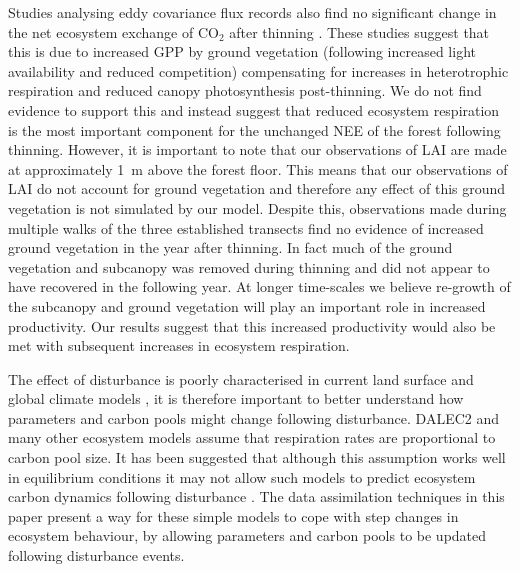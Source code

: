 \documentclass[draft,linenumbers]{agujournal}
\begin{document}
Studies analysing eddy covariance flux records also find no significant change in the net ecosystem exchange of CO\(_{2}\) after thinning \citep{vesala2005effect, wilkinson2015effects, moreaux2011paired, dore2012recovery}. These studies suggest that this is due to increased GPP by ground vegetation (following increased light availability and reduced competition) compensating for increases in heterotrophic respiration and reduced canopy photosynthesis post-thinning. We do not find evidence to support this and instead suggest that reduced ecosystem respiration is the most important component for the unchanged NEE of the forest following thinning. However, it is important to note that our observations of LAI are made at approximately 1~m above the forest floor. This means that our observations of LAI do not account for ground vegetation and therefore any effect of this ground vegetation is not simulated by our model. Despite this, observations made during multiple walks of the three established transects find no evidence of increased ground vegetation in the year after thinning. In fact much of the ground vegetation and subcanopy was removed during thinning and did not appear to have recovered in the following year. At longer time-scales we believe re-growth of the subcanopy and ground vegetation will play an important role in increased productivity. Our results suggest that this increased productivity would also be met with subsequent increases in ecosystem respiration.






The effect of disturbance is poorly characterised in current land surface and global climate models \citep{running2008ecosystem}, it is therefore important to better understand how parameters and carbon pools might change following disturbance. DALEC2 and many other ecosystem models assume that respiration rates are proportional to carbon pool size. It has been suggested that although this assumption works well in equilibrium conditions it may not allow such models to predict ecosystem carbon dynamics following disturbance \citep{schimel2003implications}. The data assimilation techniques in this paper present a way for these simple models to cope with step changes in ecosystem behaviour, by allowing parameters and carbon pools to be updated following disturbance events. 
\end{document}
